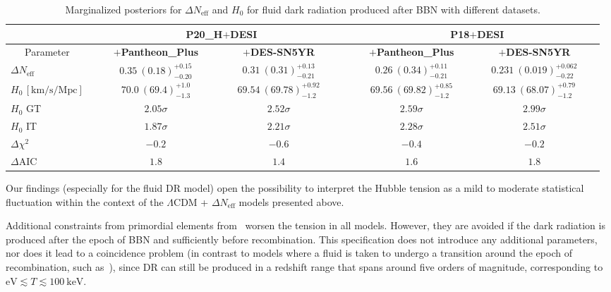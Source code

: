 \documentclass[aps,prd,twocolumn,notitlepage,
superscriptaddress,
nofootinbib,floatfix]{revtex4-2}
\newcommand{\planck}{\textbf{P18}}
\newcommand{\planckhilli}{\textbf{P20\_H}}
\newcommand{\desi}{$\mathbf{+}$\textbf{DESI}}
\newcommand{\pantheon}{$\mathbf{+}${\bf Pantheon\_Plus}}
\newcommand{\DES}{$\mathbf{+}$\textbf{DES-SN5YR}}
\begin{document}
 \begin{table}
 \begin{tabular} {| l |l| c| c|l| c| c|}
\hline\hline
\multicolumn{1}{|c|}{}& &  \multicolumn{2}{|c|}{~~\planckhilli\desi~~} &&  \multicolumn{2}{|c|}{\planck\desi}\\
 \hline
 \multicolumn{1}{|c|}{ Parameter} & & \multicolumn{1}{|c|}{~~\pantheon~~} &  \multicolumn{1}{|c|}{~~~~~\DES~~~~~} & &  \multicolumn{1}{|c|}{~~\pantheon~~} &  \multicolumn{1}{|c|}{~~~~~\DES~~~~~}\\
\hline\hline
$\Delta N_{\mbox{eff}}$  &  & $0.35~(0.18)^{+0.15}_{-0.20}      $ & $0.31~(0.31)^{+0.13}_{-0.21}      $ && $0.26~(0.34)^{+0.11}_{-0.21}      $ & $0.231~(0.019)^{+0.062}_{-0.22}    $\\
$H_0 \,[\mathrm{km}/\mathrm{s}/\mathrm{Mpc}]$ && $70.0~(69.4)^{+1.0}_{-1.3}        $ & $69.54~(69.78)^{+0.92}_{-1.2}      $ && $69.56~(69.82)^{+0.85}_{-1.2}      $ & $69.13~(68.07)^{+0.79}_{-1.2}      $\\
\hline
\hline
$H_0$ GT && $2.05\sigma $ & $2.52\sigma $& & $2.59\sigma $ & $2.99\sigma $\\
\hline
$H_0$ IT && $1.87\sigma $ & $2.21\sigma $ && $2.28\sigma $ & $2.51\sigma $\\
\hline
$\Delta \chi^2$ && $-0.2$ & $-0.6$ && $-0.4$ & $-0.2$\\
\hline
$\Delta$AIC& & $1.8$ & $1.4$& & $1.6$ & $1.8$\\
\hline
\end{tabular}

\caption{Marginalized posteriors for $\Delta N_\text{eff}$ and $H_0$ for fluid dark radiation produced after BBN with different datasets.}
\label{tab:newdata}

\end{table}

Our findings (especially for the fluid DR model) open the possibility to interpret the Hubble tension as a mild to moderate statistical fluctuation within the context of the $\Lambda$CDM + $\Delta N_\text{eff}$ models presented above.

Additional constraints from primordial elements from~\cite{Aver:2015iza, Cooke:2017cwo} worsen the tension in all models. However, they are avoided if the dark radiation is produced after the epoch of BBN and sufficiently before recombination. This specification does not introduce any additional parameters, nor does it lead to a coincidence problem (in contrast to models where a fluid is taken to undergo a transition around the epoch of recombination, such as~\cite{Poulin:2018cxd, Niedermann:2019olb, Gonzalez:2020fdy, Allali:2021azp, Aloni:2021eaq}), since DR can still be produced in a redshift range that spans around five orders of magnitude, corresponding to $\text{eV}\lesssim T\lesssim 100~\text{keV}$. 
\end{document}
